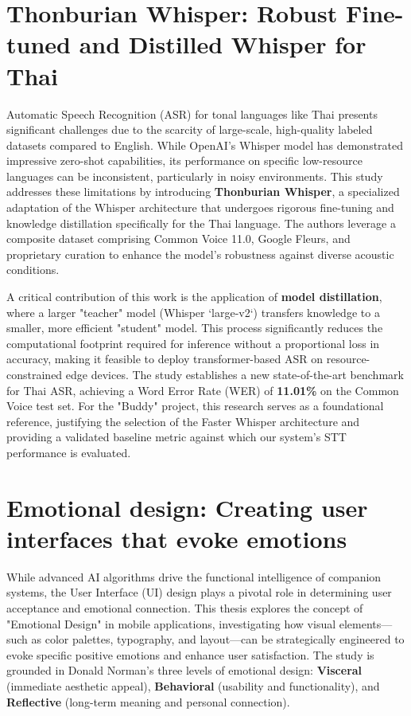 \section[Thonburian Whisper: Robust Fine-tuned and Distilled Whisper for Thai]{Thonburian Whisper: Robust Fine-tuned and Distilled Whisper for Thai \cite{aung-etal-2024-thonburian}}
\hspace*{17pt} Automatic Speech Recognition (ASR) for tonal languages like Thai presents significant challenges due to the scarcity of large-scale, high-quality labeled datasets compared to English. While OpenAI's Whisper model has demonstrated impressive zero-shot capabilities, its performance on specific low-resource languages can be inconsistent, particularly in noisy environments. This study addresses these limitations by introducing \textbf{Thonburian Whisper}, a specialized adaptation of the Whisper architecture that undergoes rigorous fine-tuning and knowledge distillation specifically for the Thai language. The authors leverage a composite dataset comprising Common Voice 11.0, Google Fleurs, and proprietary curation to enhance the model's robustness against diverse acoustic conditions.

A critical contribution of this work is the application of \textbf{model distillation}, where a larger "teacher" model (Whisper `large-v2`) transfers knowledge to a smaller, more efficient "student" model. This process significantly reduces the computational footprint required for inference without a proportional loss in accuracy, making it feasible to deploy transformer-based ASR on resource-constrained edge devices. The study establishes a new state-of-the-art benchmark for Thai ASR, achieving a Word Error Rate (WER) of \textbf{11.01\%} on the Common Voice test set. For the "Buddy" project, this research serves as a foundational reference, justifying the selection of the Faster Whisper architecture and providing a validated baseline metric against which our system's STT performance is evaluated.

\newpage
\section[Emotional design: Creating user interfaces that evoke emotions]{Emotional design: Creating user interfaces that evoke emotions \cite{paper_8}}
\hspace*{17pt} While advanced AI algorithms drive the functional intelligence of companion systems, the User Interface (UI) design plays a pivotal role in determining user acceptance and emotional connection. This thesis explores the concept of "Emotional Design" in mobile applications, investigating how visual elements—such as color palettes, typography, and layout—can be strategically engineered to evoke specific positive emotions and enhance user satisfaction. The study is grounded in Donald Norman’s three levels of emotional design: \textbf{Visceral} (immediate aesthetic appeal), \textbf{Behavioral} (usability and functionality), and \textbf{Reflective} (long-term meaning and personal connection).

